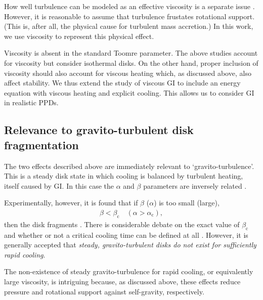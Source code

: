 \documentclass[iop, numberedappendix]{emulateapj}
\begin{document}
How well turbulence can be modeled as an effective viscosity is a
separate issue \citep{balbus99}. However, it is  
reasonable to assume that turbulence frustates rotational 
support. (This is, after all, the physical cause for turbulent mass
accretion.) In this work, we use viscosity to represent this physical
effect.  

Viscosity is absent in the standard Toomre parameter. The above
studies account for viscosity but consider isothermal disks. On the
other hand, proper inclusion of viscosity should also account for
viscous heating which, as discussed above, also affect stability. 
We thus extend the study of viscous GI to include an energy equation
with viscous heating and explicit cooling. This allows us to consider
GI in realistic PPDs.  



\subsection{Relevance to gravito-turbulent disk fragmentation}%
The two effects described above are immediately relevant to
`gravito-turbulence'. This is a steady disk state in which cooling is
balanced by turbulent heating, itself caused by GI. In this case 
the $\alpha$ and $\beta$ parameters are inversely related
\citep{gammie01}.   

Experimentally, however, it is found that if $\beta$ ($\alpha$) is
too small (large), 
\begin{align}
  \beta < \beta_\mathrm{c} \quad
  \left(\alpha>\alpha_\mathrm{c}\right), 
\end{align}
then the disk fragments \citep{gammie01,rice05,rice11}. 
There is considerable debate on the exact value of $\beta_\mathrm{c}$
and whether or not a critical cooling time can 
be defined at all \citep{meru11,meru12,paardekooper12}. However, it is
generally accepted that \emph{steady, gravito-turbulent disks do not
  exist for sufficiently rapid cooling}. 


The non-existence of steady gravito-turbulence for rapid cooling, or
equivalently large viscosity, is intriguing because, as discussed
above, these effects reduce pressure and rotational support 
against self-gravity, respectively. 
\end{document}
